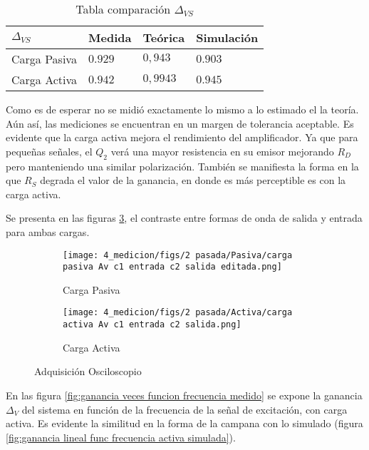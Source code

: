 \begin{table}[ht]
    \centering
    \begin{tabular}{|l|l|l|l|}
    \hline
    $\Delta_{VS} $  & Medida   & Teórica  & Simulación \\ \hline
    Carga Pasiva & $0.929$  & $0,943$ &  $0.903$       \\ \hline
    Carga Activa & $0.942$  & $0,9943$ &  $0.945$          \\ \hline
    \end{tabular}
    \caption{Tabla comparación $\Delta_{VS}$}\label{table:comp avs}
\end{table}

Como es de esperar no se midió exactamente lo mismo a lo estimado el la teoría. Aún así, las mediciones se encuentran en un margen de tolerancia aceptable. 
Es evidente que la carga activa mejora el rendimiento del amplificador. Ya que para pequeñas señales, el $Q_2$ verá una mayor resistencia en su emisor mejorando $R_D$ pero manteniendo una similar polarización. 
También se manifiesta la forma en la que $R_S$ degrada el valor de la ganancia, en donde es más perceptible es con la carga activa. 

Se presenta en las figuras \ref{fig:Av oscilo}, el contraste entre formas de onda de salida y entrada para ambas cargas.


\begin{figure}[ht]
\begin{subfigure}{.45\textwidth}
  \centering
  \texttt{[image: 4\_medicion/figs/2 pasada/Pasiva/carga pasiva Av c1 entrada c2 salida editada.png]}  
  \caption{Carga Pasiva}
  \label{fig:Av carga pasiva}
\end{subfigure}
\begin{subfigure}{.45\textwidth}
  \centering
  \texttt{[image: 4\_medicion/figs/2 pasada/Activa/carga activa Av c1 entrada c2 salida.png]}  
  \caption{Carga Activa}
  \label{fig:Av carga activa}
\end{subfigure}
\caption{Adquisición Osciloscopio}
\label{fig:Av oscilo}
\end{figure}

En las figura \ref{fig:ganancia veces funcion frecuencia medido} se expone la ganancia $\Delta_V$ del sistema en función de la frecuencia de la señal de excitación, con carga activa.
Es evidente la similitud en la forma de la campana con lo simulado (figura \ref{fig:ganancia lineal func frecuencia activa simulada}).

